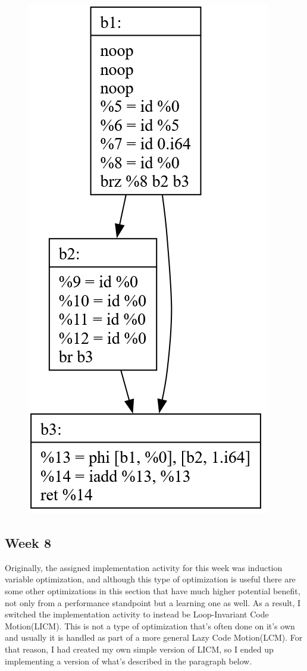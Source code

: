 \documentclass[11pt, a4paper, titlepage]{article}
\begin{document}
\begin{figure}[H]
  \centering
  \includegraphics[scale=0.3]{images/i23.png}
\end{figure}

\subsection{Week 8}

Originally, the assigned implementation activity for this week was induction variable optimization, and although this type of optimization is useful there are some other optimizations in this section that have much higher potential benefit, not only from a performance standpoint but a learning one as well. As a result, I switched the implementation activity to instead be Loop-Invariant Code Motion(LICM). This is not a type of optimization that's often done on it's own and usually it is handled as part of a more general Lazy Code Motion(LCM). For that reason, I had created my own simple version of LICM, so I ended up implementing a version of what's described in the paragraph below.
\end{document}
